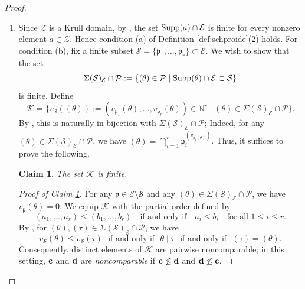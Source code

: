 \documentclass[11pt,a4paper,reqno]{amsart}
\newtheorem{claim}{Claim}
\theoremstyle{definition}
\begin{document}
\begin{proof}
\begin{enumerate}
\item Since $\mathcal Z$ is a Krull domain, by \cite[Page 289, III)]{Mat80}, the set ${\rm Supp}(a) \cap \mathcal{E}$ is finite for every nonzero element $a \in \mathcal Z$. Hence condition (a) of Definition \ref{def:schproide}(2) holds.
For condition (b), fix a finite subset $\mathcal{S}=\{ \mathfrak{p}_1,\dots,\mathfrak{p}_r\}\subset  \mathcal{E}$. We wish to show that the set 
$$
\Sigma(\mathcal{S})_{\mathcal{E}} \cap \mathcal{P}:=\{ (\theta) \in \mathcal{P} \mid {\rm Supp}(\theta) \cap \mathcal{E} \subset \mathcal{S} \}
$$ is finite. Define
$$
\mathcal{K}=\{ v_{\mathcal{S}}((\theta)):=(v_{\mathfrak{p}_1}(\theta),\dots,v_{\mathfrak{p}_r}(\theta)) \in \mathbb{N}^r \mid (\theta) \in \Sigma(\mathcal{S})_{\mathcal{E}} \cap \mathcal{P}\}.
$$ By \cite[Page 289, III)]{Mat80}, this is naturally in bijection with $\Sigma(\mathcal{S})_{\mathcal{E}} \cap \mathcal{P}$; Indeed, for any $(\theta) \in \Sigma(\mathcal{S})_{\mathcal{E}} \cap \mathcal{P}$, we have $(\theta)=\bigcap_{i=1}^r \mathfrak{p}_i^{(v_{\mathfrak{p}_i(\theta)})}$. Thus, it suffices to prove the following.

\begin{claim} \label{claim:finiteK}
The set $\mathcal{K}$ is finite.
\end{claim}

\begin{proof}[Proof of Claim \ref{claim:finiteK}] 
For any $\mathfrak{p} \in \mathcal{E} \setminus \mathcal{S}$ and any $(\theta) \in \Sigma(\mathcal{S})_{\mathcal{E}} \cap \mathcal{P}$, we have $v_{\mathfrak{p}}(\theta)=0$. We equip $\mathcal{K}$ with the partial order defined by $$(a_1,\dots,a_r)\leq (b_1,\dots,b_r)\quad\textrm{if and only if} \quad a_i \leq b_i \quad \textrm{for all }1 \leq i \leq r.
$$ By \cite[Page 288, I)]{Mat80}, for $(\theta), (\tau) \in \Sigma(\mathcal{S})_{\mathcal{E}} \cap \mathcal{P}$, we have 
\begin{equation}\label{eq:uncomkrull}
v_{\mathcal{S}}(\theta) \leq v_{\mathcal{S}}(\tau) \,\,\textrm{ if and only if }\,\, \theta \mid \tau \,\,\textrm{ if and only if }\,\, (\tau)=(\theta).
\end{equation} 
Consequently, distinct elements of $\mathcal{K}$ are pairwise noncomparable; in this setting, ${\bf c}$ and ${\bf d}$ are \emph{noncomparable} if ${\bf c}\not\leq {\bf d}$ and ${\bf d} \not\leq {\bf c}$. 


\end{proof}
\end{enumerate}
\end{proof}
\end{document}
